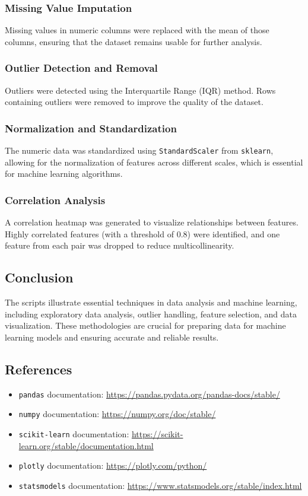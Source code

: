 \subsubsection{Missing Value Imputation}
Missing values in numeric columns were replaced with the mean of those columns, ensuring that the dataset remains usable for further analysis.

\subsubsection{Outlier Detection and Removal}
Outliers were detected using the Interquartile Range (IQR) method. Rows containing outliers were removed to improve the quality of the dataset.

\subsubsection{Normalization and Standardization}
The numeric data was standardized using \texttt{StandardScaler} from \texttt{sklearn}, allowing for the normalization of features across different scales, which is essential for machine learning algorithms.

\subsubsection{Correlation Analysis}
A correlation heatmap was generated to visualize relationships between features. Highly correlated features (with a threshold of 0.8) were identified, and one feature from each pair was dropped to reduce multicollinearity.

\subsection{Conclusion}
The scripts illustrate essential techniques in data analysis and machine learning, including exploratory data analysis, outlier handling, feature selection, and data visualization. These methodologies are crucial for preparing data for machine learning models and ensuring accurate and reliable results.

\subsection{References}
\begin{itemize}
    \item \texttt{pandas} documentation: \url{https://pandas.pydata.org/pandas-docs/stable/}
    \item \texttt{numpy} documentation: \url{https://numpy.org/doc/stable/}
    \item \texttt{scikit-learn} documentation: \url{https://scikit-learn.org/stable/documentation.html}
    \item \texttt{plotly} documentation: \url{https://plotly.com/python/}
    \item \texttt{statsmodels} documentation: \url{https://www.statsmodels.org/stable/index.html}
\end{itemize}